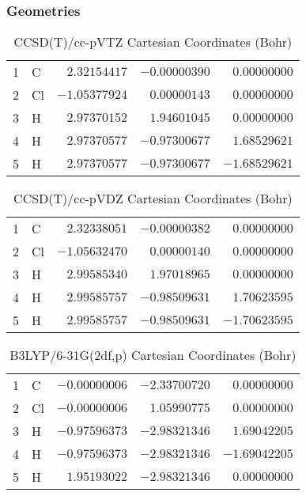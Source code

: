 \documentclass[10pt,oneside]{article}
\begin{document}
\subsubsection*{Geometries}
\begin{table}[h!]
\centering
\caption{CCSD(T)/cc-pVTZ Cartesian Coordinates (Bohr)}
\begin{tabular}{llrrr}
1  & C  & $ 2.32154417$ & $-0.00000390$ & $ 0.00000000$ \\
2  & Cl & $-1.05377924$ & $ 0.00000143$ & $ 0.00000000$ \\
3  & H  & $ 2.97370152$ & $ 1.94601045$ & $ 0.00000000$ \\
4  & H  & $ 2.97370577$ & $-0.97300677$ & $ 1.68529621$ \\
5  & H  & $ 2.97370577$ & $-0.97300677$ & $-1.68529621$ \\
\end{tabular}
\end{table}

\begin{table}[h!]
\centering
\caption{CCSD(T)/cc-pVDZ Cartesian Coordinates (Bohr)}
\begin{tabular}{llrrr}
1  & C  & $ 2.32338051$ & $-0.00000382$ & $ 0.00000000$ \\
2  & Cl & $-1.05632470$ & $ 0.00000140$ & $ 0.00000000$ \\
3  & H  & $ 2.99585340$ & $ 1.97018965$ & $ 0.00000000$ \\
4  & H  & $ 2.99585757$ & $-0.98509631$ & $ 1.70623595$ \\
5  & H  & $ 2.99585757$ & $-0.98509631$ & $-1.70623595$ \\
\end{tabular}
\end{table}

\begin{table}[h!]
\centering
\caption{B3LYP/6-31G(2df,p) Cartesian Coordinates (Bohr)}
\begin{tabular}{llrrr}
1  & C  & $-0.00000006$ & $-2.33700720$ & $ 0.00000000$ \\
2  & Cl & $-0.00000006$ & $ 1.05990775$ & $ 0.00000000$ \\
3  & H  & $-0.97596373$ & $-2.98321346$ & $ 1.69042205$ \\
4  & H  & $-0.97596373$ & $-2.98321346$ & $-1.69042205$ \\
5  & H  & $ 1.95193022$ & $-2.98321346$ & $ 0.00000000$ \\
\end{tabular}
\end{table}
\end{document}
